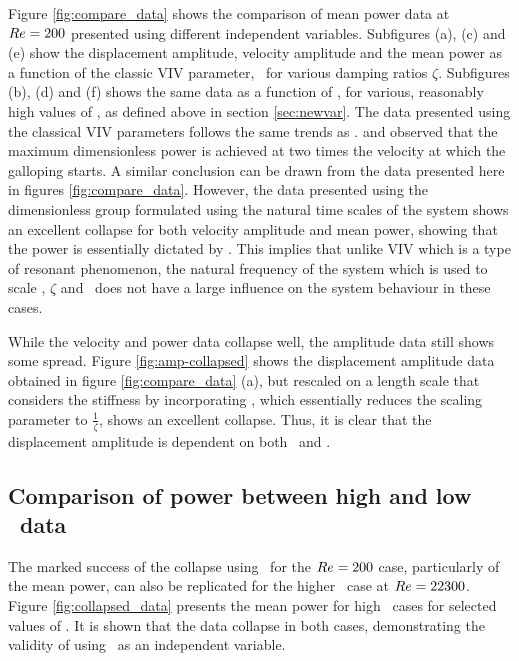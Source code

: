  
 Figure \ref{fig:compare_data} shows the comparison of mean power data at $Re=200$ presented using different independent variables. Subfigures (a), (c) and (e) show the displacement amplitude, velocity amplitude and the mean power as a function of the classic VIV parameter, \ustar \ for various damping ratios $\zeta$. Subfigures (b), (d) and (f) shows the same data as a function of \massdamp, for various, reasonably high values of \massstiff, as defined above in section \ref{sec:newvar}. The data presented using the classical VIV parameters follows the same trends as \cite{Barrero-Gil2010a}. \citet{Barrero-Gil2010a} and \citet{vicente-Ludlam2014} observed that the maximum dimensionless power is achieved at two times the velocity at which the galloping starts. A similar conclusion can be drawn from the data presented here in figures \ref{fig:compare_data}. However, the data presented using the dimensionless group formulated using the natural time scales of the system shows an excellent collapse for both velocity amplitude and mean power, showing that the power is essentially dictated by \massdamp. This implies that unlike VIV which is a type of resonant phenomenon, the natural frequency of the system which is used to scale \ustar, $\zeta$ and \massstiff\ does not have a large influence on the system behaviour in these cases.
 
 
 
 
  
  
 
While the velocity and power data collapse well, the amplitude data still shows some spread. Figure \ref{fig:amp-collapsed} shows the displacement amplitude data obtained in figure \ref{fig:compare_data} (a), but rescaled on a length scale that considers the stiffness by incorporating \massstiff, which essentially reduces the scaling parameter to $\frac{1}{\zeta}$, shows an excellent collapse. Thus, it is clear that the displacement amplitude is dependent on both \massstiff\ and \massdamp. 


 \subsection{Comparison of power between high and low \reynoldsnumber\ data}   

\label{sec:low_vs_high_re}
The marked success of the collapse using \massdamp\ for the $Re = 200$ case, particularly of the mean power, can also be replicated for the higher \reynoldsnumber\ case at $Re = 22300$. Figure \ref{fig:collapsed_data} presents the mean power for high \reynoldsnumber\ cases for selected values of \massstiff. It is shown that the data collapse in both cases, demonstrating the validity of using \massdamp\ as an independent variable.

